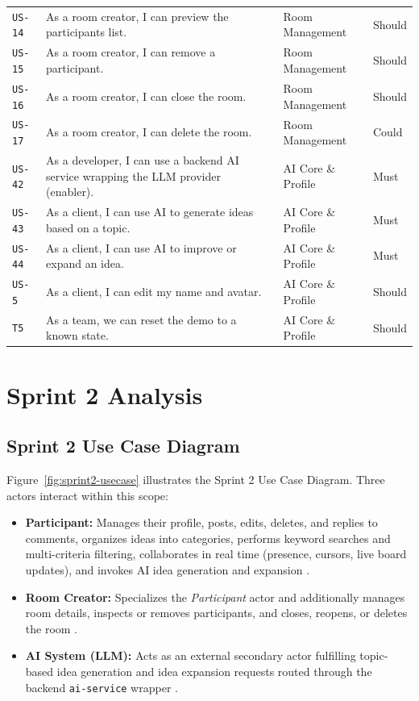 \begin{table}[htbp]
\begin{tabularx}{\textwidth}{@{} l X l l @{}}
\texttt{US-14} & As a room creator, I can preview the participants list. & Room Management & Should \\
\texttt{US-15} & As a room creator, I can remove a participant. & Room Management & Should \\
\texttt{US-16} & As a room creator, I can close the room. & Room Management & Should \\
\texttt{US-17} & As a room creator, I can delete the room. & Room Management & Could \\
\midrule
\texttt{US-42} & As a developer, I can use a backend AI service wrapping the LLM provider (enabler). & AI Core \& Profile & Must \\
\texttt{US-43} & As a client, I can use AI to generate ideas based on a topic. & AI Core \& Profile & Must \\
\texttt{US-44} & As a client, I can use AI to improve or expand an idea. & AI Core \& Profile & Must \\
\texttt{US-5}  & As a client, I can edit my name and avatar. & AI Core \& Profile & Should \\
\texttt{T5}    & As a team, we can reset the demo to a known state. & AI Core \& Profile & Should \\
\bottomrule
\end{tabularx}
\end{table}

\section{Sprint 2 Analysis}

\subsection{Sprint 2 Use Case Diagram}

Figure~\ref{fig:sprint2-usecase} illustrates the Sprint 2 Use Case Diagram. Three actors interact within this scope:
\begin{itemize}
    \item \textbf{Participant:} Manages their profile, posts, edits, deletes, and replies to comments, organizes ideas into categories, performs keyword searches and multi-criteria filtering, collaborates in real time (presence, cursors, live board updates), and invokes AI idea generation and expansion \cite{backlog}.
    \item \textbf{Room Creator:} Specializes the \textit{Participant} actor and additionally manages room details, inspects or removes participants, and closes, reopens, or deletes the room \cite{backlog}.
    \item \textbf{AI System (LLM):} Acts as an external secondary actor fulfilling topic-based idea generation and idea expansion requests routed through the backend \texttt{ai-service} wrapper \cite{backlog}.
\end{itemize}

